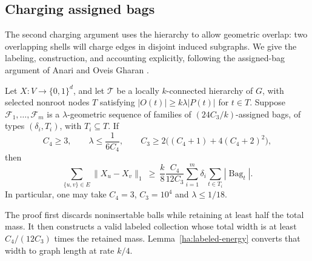 \subsection{Charging assigned bags}
\label{sec:hierarchy-assigned}

The second charging argument uses the hierarchy to allow geometric overlap:
two overlapping shells will charge edges in disjoint induced subgraphs.
We give the labeling, construction, and accounting explicitly, following
the assigned-bag argument of Anari and Oveis Gharan
\cite[Proposition~7.2 and Section~7.2]{AOG}.

\begin{proposition}
\label{prop:hierarchy-assigned}
Let $X:V\to\{0,1\}^{d}$, and let $\mathcal T$ be a locally
$k$-connected hierarchy of $G$, with selected nonroot nodes $T$ satisfying
$|O(t)|\ge k\lambda|P(t)|$ for $t\in T$.
Suppose $\mathcal F_1,\ldots,\mathcal F_m$ is a $\lambda$-geometric
sequence of families of $(24C_3/k)$-assigned bags, of types
$(\delta_i,T_i)$, with $T_i\subseteq T$.  If
\[
 C_4\ge3,\qquad \lambda\le\frac1{6C_4},\qquad
 C_3\ge2\bigl((C_4+1)+4(C_4+2)^2\bigr),
\]
then
\begin{equation}\label{ha:assigned-bound}
 \sum_{\{u,v\}\in E}\|X_u-X_v\|_1
 \ \ge\ \frac{k}{8}\frac{C_4}{12C_3}
 \sum_{i=1}^m\delta_i\sum_{t\in T_i}|\operatorname{Bag}_t|.
\end{equation}
In particular, one may take $C_4=3$, $C_3=10^4$ and
$\lambda\le1/18$.
\end{proposition}

The proof first discards noninsertable balls while retaining at least
half the total mass. It then constructs a valid labeled collection
whose total width is at least $C_4/(12C_3)$ times the retained mass.
Lemma~\ref{ha:labeled-energy} converts that width to graph length
at rate $k/4$.





